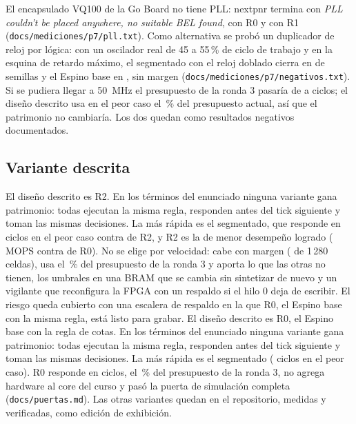 \documentclass[11pt,a4paper]{article}
\newcommand{\arch}[1]{\texttt{#1}}
\begin{document}
El encapsulado VQ100 de la Go Board no tiene PLL: nextpnr termina con \emph{PLL couldn't be placed anywhere, no suitable BEL found}, con R0 y con R1 (\arch{docs/mediciones/p7/pll.txt}). Como alternativa se probó un duplicador de reloj por lógica: con un oscilador real de 45 a 55\,\% de ciclo de trabajo y en la esquina de retardo máximo, el segmentado con el reloj doblado cierra en \pSieteDobleSemillas{} de \pSieteDobleSemillasTotal{} semillas y el Espino base en \pSieteDobleSemillasBase{}, sin margen (\arch{docs/mediciones/p7/negativos.txt}). Si se pudiera llegar a 50~MHz el presupuesto de la ronda 3 pasaría de \pSietePresupuestoRtres{} a \pSietePresupuestoDobleRtres{} ciclos; el diseño descrito usa en el peor caso el \cifraUsoPresuRondaTres\,\% del presupuesto actual, así que el patrimonio no cambiaría. Los dos quedan como resultados negativos documentados.

\subsection{Variante descrita}

\ifpeldanofondo
El diseño descrito es R2. En los términos del enunciado ninguna variante gana patrimonio: todas ejecutan la misma regla, responden antes del tick siguiente y toman las mismas decisiones. La más rápida es el segmentado, que responde en \pCotasRespPeorSeg{} ciclos en el peor caso contra \pCotasRespPeorRdos{} de R2, y R2 es la de menor desempeño logrado (\pCotasMopsRdos{} MOPS contra \pCotasMopsRcero{} de R0). No se elige por velocidad: cabe con margen (\pCotasCeldasRdos{} de 1\,280 celdas), usa el \cifraUsoPresuRondaTres\,\% del presupuesto de la ronda 3 y aporta lo que las otras no tienen, los umbrales en una BRAM que se cambia sin sintetizar de nuevo y un vigilante que reconfigura la FPGA con un respaldo si el hilo 0 deja de escribir. El riesgo queda cubierto con una escalera de respaldo en la que R0, el Espino base con la misma regla, está listo para grabar.
\else
El diseño descrito es R0, el Espino base con la regla de cotas. En los términos del enunciado ninguna variante gana patrimonio: todas ejecutan la misma regla, responden antes del tick siguiente y toman las mismas decisiones. La más rápida es el segmentado (\pCotasRespPeorSeg{} ciclos en el peor caso). R0 responde en \cifraRespPeor{} ciclos, el \cifraUsoPresuRondaTres\,\% del presupuesto de la ronda 3, no agrega hardware al core del curso y pasó la puerta de simulación completa (\arch{docs/puertas.md}). Las otras variantes quedan en el repositorio, medidas y verificadas, como edición de exhibición.
\fi
\fi
\end{document}
